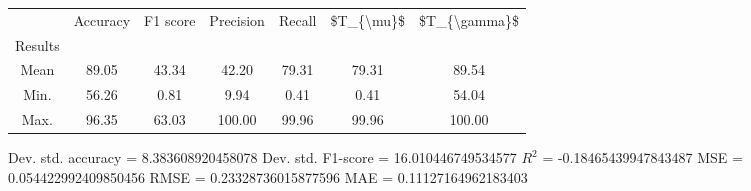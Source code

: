 \begin{tabular}{|c|c|c|c|c|c|c|}
\toprule
{} &  Accuracy &  F1 score &  Precision &  Recall &  \$T\_\{\textbackslash mu\}\$ &  \$T\_\{\textbackslash gamma\}\$ \\
Results &           &           &            &         &            &               \\
\hline
Mean    &     89.05 &     43.34 &      42.20 &   79.31 &      79.31 &         89.54 \\
Min.    &     56.26 &      0.81 &       9.94 &    0.41 &       0.41 &         54.04 \\
Max.    &     96.35 &     63.03 &     100.00 &   99.96 &      99.96 &        100.00 \\
\bottomrule
\end{tabular}

 Dev. std. accuracy = 8.383608920458078
 Dev. std. F1-score = 16.010446749534577
 $R^2$ = -0.18465439947843487
 MSE = 0.054422992409850456
 RMSE = 0.23328736015877596
 MAE = 0.11127164962183403